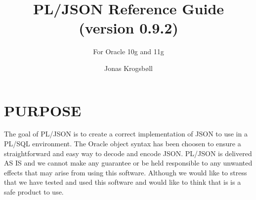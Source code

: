 \documentclass[11pt,a4paper]{article}
\title{PL/JSON Reference Guide (version 0.9.2)}
\subtitle{For Oracle 10g and 11g}
\author{Jonas Krogsbøll}
\date{}
\begin{document}
\maketitle
\vspace{2in}
\tableofcontents
\newpage

\section{PURPOSE}
The goal of PL/JSON is to create a correct implementation of JSON to use in a PL/SQL environment. The Oracle object syntax has been choosen to ensure a straightforward and easy way to decode and encode JSON. PL/JSON is delivered AS IS and we cannot make any guarantee or be held responsible to any unwanted effects that may arise from using this software. Although we would like to stress that we have tested and used this software and would like to think that is is a safe product to use.
\end{document}
